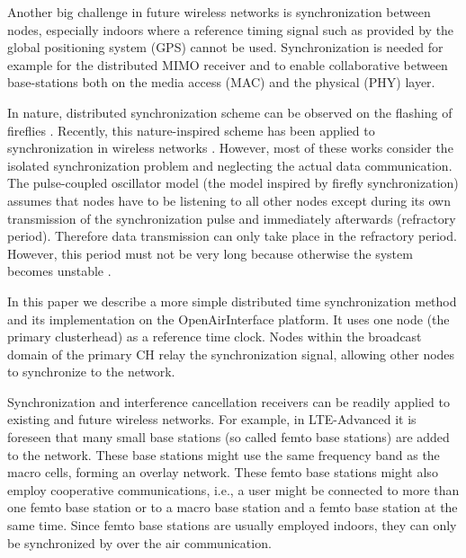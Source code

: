 \documentclass[a4paper,twocolumn,journal]{IEEEtran}
\begin{document}
Another big challenge in future wireless networks is synchronization between nodes, especially indoors where a reference timing signal such as provided by the global positioning system (GPS) cannot be used. Synchronization is needed for example for the distributed MIMO receiver and to enable collaborative between base-stations both on the media access (MAC) and the physical (PHY) layer. 

In nature, distributed synchronization scheme can be observed on the flashing of fireflies \cite{Buck1976}. Recently, this nature-inspired scheme has been applied to synchronization in wireless networks \cite{simeone08distributed,tyrell06fireflies,hong05scalable,hu06scalability}. However, most of these works consider the isolated synchronization problem and neglecting the actual data communication. The pulse-coupled oscillator model (the model inspired by firefly synchronization) assumes that nodes have to be listening to all other nodes except during its own transmission of the synchronization pulse and immediately afterwards (refractory period). Therefore data transmission can only take place in the refractory period. However, this period must not be very long because otherwise the system becomes unstable \cite{hong05scalable}. 

In this paper we describe a more simple distributed time synchronization method and its implementation on the OpenAirInterface platform. It uses one node (the primary clusterhead) as a reference time clock. Nodes within the broadcast domain of the primary CH relay the synchronization signal, allowing other nodes to synchronize to the network. 



Synchronization and interference cancellation receivers can be readily applied to existing and future wireless networks. For example, in LTE-Advanced it is foreseen that many small base stations (so called femto base stations) are added to the network. These base stations might use the same frequency band as the macro cells, forming an overlay network. These femto base stations might also employ cooperative communications, i.e., a user might be connected to more than one femto base station or to a macro base station and a femto base station at the same time. Since femto base stations are usually employed indoors, they can only be synchronized by over the air communication. 
\end{document}
